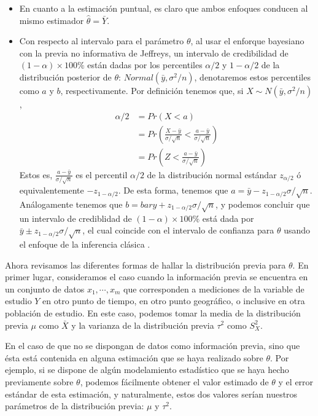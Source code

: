 \documentclass[10pt,openright]{book}\usepackage[]{graphicx}\usepackage[]{color}
\begin{document}
    \begin{itemize}
    \item En cuanto a la estimaci\'on puntual, es claro que ambos enfoques conducen al mismo estimador $\hat{\theta}=\bar{Y}$.
    \item Con respecto al intervalo para el par\'ametro $\theta$, al usar el enforque bayesiano con la previa no informativa de   Jeffreys, un intervalo de credibilidad de $(1-\alpha)\times 100\%$ est\'an dadas por los percentiles $\alpha/2$ y $1-\alpha   /2$ de la distribuci\'on posterior de $\theta$: $Normal(\bar{y},\sigma^2/n)$, denotaremos estos percentiles como $a$ y $b$, respectivamente. 
    Por definici\'on tenemos que, si $X\sim N(\bar{y},\sigma^2/n)$,
    \begin{align*}
    \alpha/2&=Pr(X<a)\\
    &=Pr(\frac{X-\bar{y}}{\sigma/\sqrt{n}}<\frac{a-\bar{y}}{\sigma/\sqrt{n}})\\
    &=Pr(Z < \frac{a-\bar{y}}{\sigma/\sqrt{n}})
    \end{align*}
    Estos es, $\frac{a-\bar{y}}{\sigma/\sqrt{n}}$ es el percentil $\alpha/2$ de la distribuci\'on normal est\'andar $z_{\alpha/2}$ \'o equivalentemente $-z_{1-\alpha/2}$. De esta forma, tenemos que $a=\bar{y}-z_{1-\alpha/2}\sigma/\sqrt{n}$. An\'alogamente tenemos que $b=bar{y}+z_{1-\alpha/2}\sigma/\sqrt{n}$, y podemos concluir que un intervalo de crediblidad de $(1-\alpha)\times 100\%$ est\'a dada por $\bar{y}\pm z_{1-\alpha/2}\sigma/\sqrt{n}$, el cual coincide con el intervalo de confianza para $\theta$ usando el enfoque de la inferencia cl\'asica \cite{Zhang}.
    \end{itemize}
    
    Ahora revisamos las diferentes formas de hallar la distribuci\'on previa para $\theta$. En primer lugar, consideramos el caso cuando la informaci\'on previa se encuentra en un conjunto de datos $x_1,\cdots,x_{m}$ que corresponden a mediciones de la variable de estudio $Y$ en otro punto de tiempo, en otro punto geogr\'afico, o inclusive en otra poblaci\'on de estudio. En este caso, podemos tomar la media de la distribuci\'on previa $\mu$ como $\bar{X}$ y la varianza de la distribuci\'on previa $\tau^2$ como $S^2_X$.
    
    En el caso de que no se dispongan de datos como informaci\'on previa, sino que \'esta est\'a contenida en alguna estimaci\'on que se haya realizado sobre $\theta$. Por ejemplo, si se dispone de alg\'un modelamiento estad\'istico que se haya hecho previamente sobre $\theta$, podemos f\'acilmente obtener el valor estimado de $\theta$ y el error est\'andar de esta estimaci\'on, y naturalmente, estos dos valores ser\'ian nuestros par\'ametros de la distribuci\'on previa: $\mu$ y $\tau^2$. 
    
\end{document}
